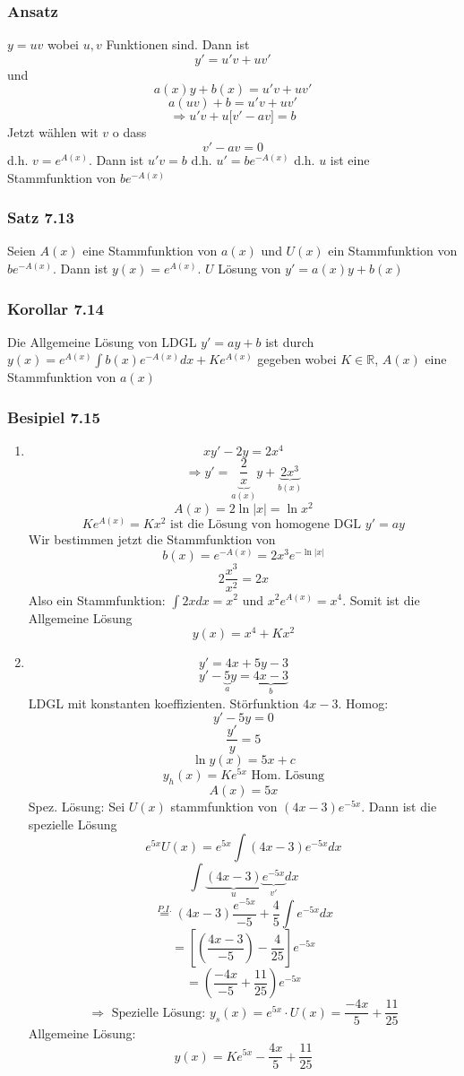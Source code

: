 \subsubsection*{Ansatz}
$y=uv$ wobei $u,v$ Funktionen sind. Dann ist $$y'=u'v+uv'$$ und $$a(x)y+b(x)=u'v+uv'$$$$a(uv)+b=u'v+uv'$$$$\Rightarrow u'v+u\lbrack v'-av\rbrack =b$$
Jetzt wählen wit $v$ o dass $$v'-av=0$$ d.h. $v=e^{A(x)}$. Dann ist $u'v=b$ d.h. $u'=be^{-A(x)}$ d.h. $u$ ist eine Stammfunktion von $be^{-A(x)}$

\subsubsection*{Satz 7.13}
Seien $A(x)$ eine Stammfunktion von $a(x)$ und $U(x)$ ein Stammfunktion von $be^{-A(x)}$. Dann ist $y(x)=e^{A(x)}$. $U$ Lösung von $y'=a(x)y+b(x)$

\subsubsection*{Korollar 7.14}
Die Allgemeine Lösung von LDGL $y'=ay+b$ ist durch $y(x)=e^{A(x)}\int{b(x)e^{-A(x)} dx}+Ke^{A(x)}$ gegeben wobei $K\in\mathbb{R}$, $A(x)$ eine Stammfunktion von $a(x)$

\subsubsection*{Besipiel 7.15}
\begin{enumerate}
\item $$xy'-2y=2x^4$$
$$\Rightarrow y' = \underbrace {\frac{2}{x}}_{a(x)}y + \underbrace {2{x^3}}_{b(x)}$$
$$A(x)=2\ln\left| x \right|=\ln x^2$$
$$Ke^{A(x)}=Kx^2\text{ ist die Lösung von homogene DGL }y'=ay$$
Wir bestimmen jetzt die Stammfunktion von $$b(x)=e^{-A(x)}=2x^3e^{-\ln \left| x\right|}$$
$$2\frac{x^3}{x^2}=2x$$
Also ein Stammfunktion: $\int{2xdx=x^2}$ und $x^2e^{A(x)}=x^4$. Somit ist die Allgemeine Lösung $$y(x)=x^4+Kx^2$$
\item $$y'=4x+5y-3$$
\[y' - \underbrace 5_ay = \underbrace {4x - 3}_b\]
LDGL mit konstanten koeffizienten. Störfunktion $4x-3$. Homog: $$y'-5y=0$$
$$\frac{y'}{y}=5$$
$$\ln y(x)=5x+c$$
$$y_h(x)=Ke^{5x} \text{ Hom. Lösung}$$
$$A(x)=5x$$
Spez. Lösung: Sei $U(x)$ stammfunktion von $(4x-3)e^{-5x}$. Dann ist die spezielle Lösung $$e^{5x}U(x)=e^{5x}\int{(4x-3)e^{-5x}dx}$$
$$ \int {\underbrace {(4x - 3)}_u\underbrace {{e^{ - 5x}}}_{v'}dx} $$
$$\mathop = \limits^{P.I.} (4x - 3)\frac{{{e^{ - 5x}}}}{{ - 5}} + \frac{4}{5}\int {{e^{ - 5x}}dx}$$
$$ = \left[ {\left( {\frac{{4x - 3}}{{ - 5}}} \right) - \frac{4}{{25}}} \right]{e^{ - 5x}}$$
$$ = \left( {\frac{{ - 4x}}{{ - 5}} + \frac{{11}}{{25}}} \right){e^{ - 5x}}$$
$$\Rightarrow \text{ Spezielle Lösung: }y_s(x)=e^{5x}\cdot U(x)=\frac{-4x}{5}+\frac{11}{25}$$
Allgemeine Lösung: $$y(x)=Ke^{5x}-\frac{4x}{5}+\frac{11}{25}$$
\end{enumerate}

